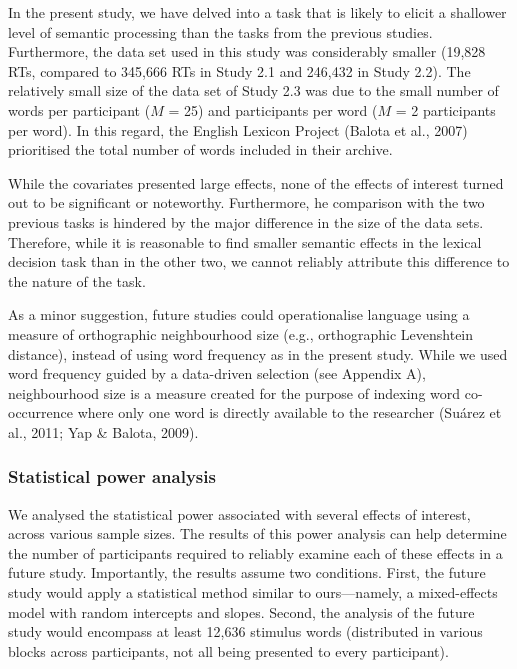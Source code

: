 \documentclass[
  12pt,
  man,floatsintext]{apa7}
\begin{document}
In the present study, we have delved into a task that is likely to elicit a shallower level of semantic processing than the tasks from the previous studies. Furthermore, the data set used in this study was considerably smaller (19,828 RTs, compared to 345,666 RTs in Study 2.1 and 246,432 in Study 2.2). The relatively small size of the data set of Study 2.3 was due to the small number of words per participant (\(M\) = 25) and participants per word (\(M\) = 2 participants per word). In this regard, the English Lexicon Project (Balota et al., 2007) prioritised the total number of words included in their archive.

While the covariates presented large effects, none of the effects of interest turned out to be significant or noteworthy. Furthermore, he comparison with the two previous tasks is hindered by the major difference in the size of the data sets. Therefore, while it is reasonable to find smaller semantic effects in the lexical decision task than in the other two, we cannot reliably attribute this difference to the nature of the task.

As a minor suggestion, future studies could operationalise language using a measure of orthographic neighbourhood size (e.g., orthographic Levenshtein distance), instead of using word frequency as in the present study. While we used word frequency guided by a data-driven selection (see Appendix A), neighbourhood size is a measure created for the purpose of indexing word co-occurrence where only one word is directly available to the researcher (Suárez et al., 2011; Yap \& Balota, 2009).

\hypertarget{statistical-power-analysis-7}{%
\subsubsection{Statistical power analysis}\label{statistical-power-analysis-7}}

We analysed the statistical power associated with several effects of interest, across various sample sizes. The results of this power analysis can help determine the number of participants required to reliably examine each of these effects in a future study. Importantly, the results assume two conditions. First, the future study would apply a statistical method similar to ours---namely, a mixed-effects model with random intercepts and slopes. Second, the analysis of the future study would encompass at least 12,636 stimulus words (distributed in various blocks across participants, not all being presented to every participant).
\end{document}

